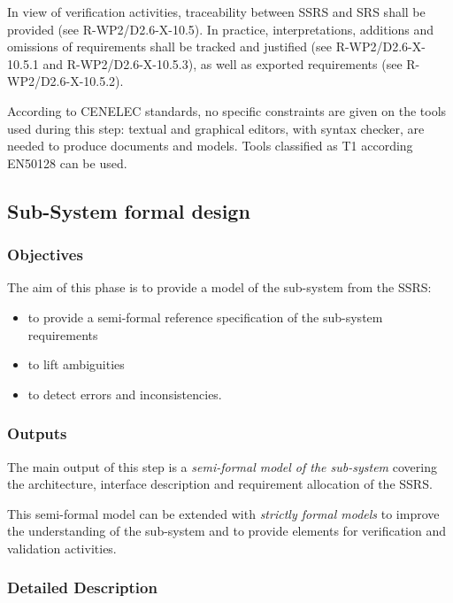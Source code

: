 In view of verification activities, traceability between SSRS and SRS shall be provided (see R-WP2/D2.6-X-10.5). In practice, interpretations, additions and omissions of requirements shall be tracked and justified (see R-WP2/D2.6-X-10.5.1 and R-WP2/D2.6-X-10.5.3), as well as exported requirements  (see R-WP2/D2.6-X-10.5.2).

According to  CENELEC standards, no specific constraints are given on the tools used during this step: textual and graphical editors, with syntax checker, are needed to  produce documents and models. Tools classified as T1 according EN50128 can be used.


\subsection{Sub-System formal design}
\label{sec:subsyst-formal-design}



\subsubsection{Objectives}
\label{sec:sys-fm-objective}

The aim of this phase is to provide a model of the sub-system from the SSRS:

\begin{itemize}
\item to provide a semi-formal reference specification of the sub-system requirements
\item to lift ambiguities
\item to detect errors and inconsistencies.
\end{itemize}


\subsubsection{Outputs}
\label{sec:sys-fm-outputs}


The main output of this step is a \textit{semi-formal model of the sub-system}  covering the architecture, interface description and requirement allocation of the SSRS.

This semi-formal model can be extended with \textit{strictly formal models} to improve the understanding of the sub-system and to provide elements for verification and validation activities.

\subsubsection{Detailed Description}
\label{sec:sys-dev-deta-descr}


